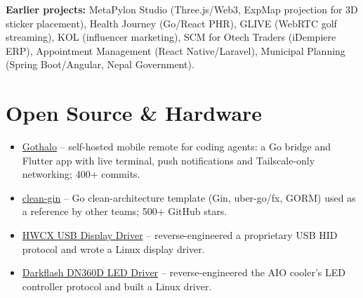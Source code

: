 \documentclass[letterpaper,11pt]{article}
\newcommand{\resumeItem}[1]{
	\item\small{
		{ #1 \vspace{-2pt}}
	}
}
\newcommand{\resumeItemListStart}{\begin{itemize}}
\newcommand{\resumeItemListEnd}{\end{itemize}\vspace{-5pt}}
\begin{document}
	\vspace{-2pt}
	{\small \textbf{Earlier projects:} MetaPylon Studio (Three.js/Web3, ExpMap projection for 3D sticker placement), Health Journey (Go/React PHR), GLIVE (WebRTC golf streaming), KOL (influencer marketing), SCM for Otech Traders (iDempiere ERP), Appointment Management (React Native/Laravel), Municipal Planning (Spring Boot/Angular, Nepal Government).}

	\section{Open Source \& Hardware}
	\resumeItemListStart
	\resumeItem
	{\href{https://github.com/dipeshdulal/gothalo}{Gothalo} -- self-hosted mobile remote for coding agents: a Go bridge and Flutter app with live terminal, push notifications and Tailscale-only networking; 400+ commits.}
	\resumeItem
	{\href{https://github.com/dipeshdulal/clean-gin}{clean-gin} -- Go clean-architecture template (Gin, uber-go/fx, GORM) used as a reference by other teams; 500+ GitHub stars.}
	\resumeItem
	{\href{https://github.com/dipeshdulal/hwcx-usb-display}{HWCX USB Display Driver} -- reverse-engineered a proprietary USB HID protocol and wrote a Linux display driver.}
	\resumeItem
	{\href{https://github.com/dipeshdulal/darkflash-dn360d-led-driver}{Darkflash DN360D LED Driver} -- reverse-engineered the AIO cooler's LED controller protocol and built a Linux driver.}
	\resumeItemListEnd
	
\end{document}
